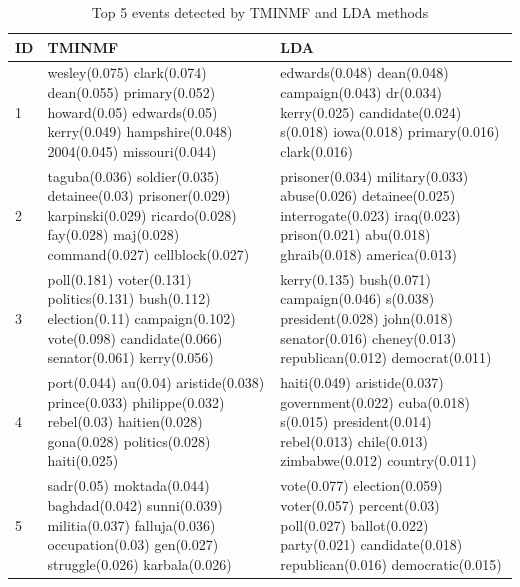 \documentclass{sig-alternate}
\begin{document}
\begin{table}
\small
\begin{tabular}{| l | p{7cm} | p{7cm} | } \hline
{\bf ID } & {\bf TMINMF} & {\bf LDA } \\ \hline
1 & wesley(0.075) clark(0.074) dean(0.055) primary(0.052) howard(0.05) edwards(0.05) kerry(0.049) hampshire(0.048) 2004(0.045) missouri(0.044) & 
edwards(0.048) dean(0.048) campaign(0.043) dr(0.034) kerry(0.025) candidate(0.024) s(0.018) iowa(0.018) primary(0.016) clark(0.016) \\ \hline
2 & taguba(0.036) soldier(0.035) detainee(0.03) prisoner(0.029) karpinski(0.029) ricardo(0.028) fay(0.028) maj(0.028) command(0.027) cellblock(0.027) &
prisoner(0.034) military(0.033) abuse(0.026) detainee(0.025) interrogate(0.023) iraq(0.023) prison(0.021) abu(0.018) ghraib(0.018) america(0.013) \\ \hline
3 & poll(0.181) voter(0.131) politics(0.131) bush(0.112) election(0.11) campaign(0.102) vote(0.098) candidate(0.066) senator(0.061) kerry(0.056) &
kerry(0.135) bush(0.071) campaign(0.046) s(0.038) president(0.028) john(0.018) senator(0.016) cheney(0.013) republican(0.012) democrat(0.011) \\ \hline
4 & port(0.044) au(0.04) aristide(0.038) prince(0.033) philippe(0.032) rebel(0.03) haitien(0.028) gona(0.028) politics(0.028) haiti(0.025) &
haiti(0.049) aristide(0.037) government(0.022) cuba(0.018) s(0.015) president(0.014) rebel(0.013) chile(0.013) zimbabwe(0.012) country(0.011) \\ \hline
5 & sadr(0.05) moktada(0.044) baghdad(0.042) sunni(0.039) militia(0.037) falluja(0.036) occupation(0.03) gen(0.027) struggle(0.026) karbala(0.026) &
vote(0.077) election(0.059) voter(0.057) percent(0.03) poll(0.027) ballot(0.022) party(0.021) candidate(0.018) republican(0.016) democratic(0.015) \\ \hline
\end{tabular}
\caption{Top 5 events detected by TMINMF and LDA methods}
\label{table.top5}
\end{table}
\end{document}
